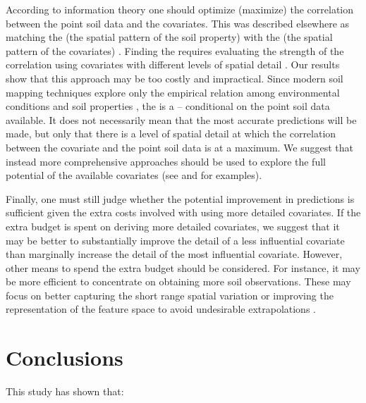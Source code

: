 According to information theory one should optimize (maximize) the correlation between the point soil data and 
the covariates. This was described elsewhere as matching the  (the spatial pattern of the 
soil property) with the  (the spatial pattern of the covariates) \cite{DunganEtAl2002, 
MillerEtAl2014}. Finding the  requires evaluating the strength of the correlation using covariates 
with different levels of spatial detail \cite{DragutEtAl2009, CavazziEtAl2013, MillerEtAl2015}. Our results 
show that this approach may be too costly and impractical. Since modern soil mapping techniques explore only 
the empirical relation among environmental conditions and soil properties \cite{Grunwald2009}, the 
is a  -- conditional on the point soil data available. It does not necessarily mean 
that the most accurate predictions will be made, but only that there is a level of spatial detail at which the 
correlation between the covariate and the point soil data is at a maximum. We suggest that instead more 
comprehensive approaches should be used to explore the full potential of the available covariates (see 
 and  for examples).

Finally, one must still judge whether the potential improvement in predictions is sufficient given the extra 
costs involved with using more detailed covariates. If the extra budget is spent on deriving more detailed 
covariates, we suggest that it may be better to substantially improve the detail of a less influential
covariate than marginally increase the detail of the most influential covariate. However, other means to spend 
the extra budget should be considered. For instance, it may be more efficient to concentrate on obtaining more 
soil observations. These may focus on better capturing the short range spatial variation \cite{BrusEtAl2007a} 
or improving the representation of the feature space to avoid undesirable extrapolations 
\cite{MinasnyEtAl2006b}.

\section{Conclusions}

This study has shown that:

